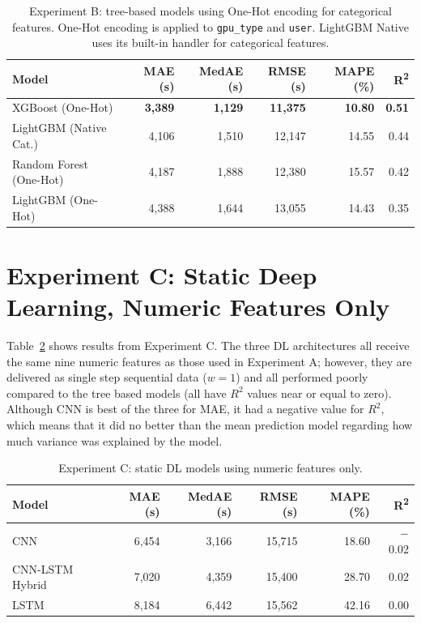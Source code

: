 \begin{table}[H]
\centering
\caption[Results for Experiment B]{Experiment B: tree-based models using One-Hot encoding for categorical features. One-Hot encoding is applied to \texttt{gpu\_type} and \texttt{user}. LightGBM Native uses its built-in handler for categorical features.}
\label{tab:expb-full}
\begin{tabular}{lrrrrr}
\hline
\textbf{Model} & \textbf{MAE (s)} & \textbf{MedAE (s)} & \textbf{RMSE (s)} & \textbf{MAPE (\%)} & \textbf{R\textsuperscript{2}} \\ 
\hline
XGBoost (One-Hot)        & \textbf{3{,}389} & \textbf{1{,}129} & \textbf{11{,}375} & \textbf{10.80} & \textbf{0.51} \\ 
LightGBM (Native Cat.)   & 4{,}106 & 1{,}510 & 12{,}147 & 14.55 & 0.44 \\ 
Random Forest (One-Hot)  & 4{,}187 & 1{,}888 & 12{,}380 & 15.57 & 0.42 \\ 
LightGBM (One-Hot)       & 4{,}388 & 1{,}644 & 13{,}055 & 14.43 & 0.35 \\ 
\hline
\end{tabular}
\end{table}

\clearpage
\section{Experiment C: Static Deep Learning, Numeric Features Only}

Table~\ref{tab:expc-full} shows results from Experiment C. The three DL architectures all receive the same nine numeric features as those used in Experiment A; however, they are delivered as single step sequential data ($w=1$) and all performed poorly compared to the tree based models (all have $R^{2}$ values near or equal to zero). Although CNN is best of the three for MAE, it had a negative value for $R^{2}$, which means that it did no better than the mean prediction model regarding how much variance was explained by the model.

\begin{table}[H]
\centering
\caption[Results for Experiment C]{Experiment C: static DL models using numeric features only.}
\label{tab:expc-full}
\begin{tabular}{lrrrrr}
\hline
\textbf{Model} & \textbf{MAE (s)} & \textbf{MedAE (s)} & \textbf{RMSE (s)} & \textbf{MAPE (\%)} & \textbf{R\textsuperscript{2}} \\ 
\hline
CNN            & 6{,}454 & 3{,}166 & 15{,}715 & 18.60 & $-$0.02 \\ 
CNN-LSTM Hybrid & 7{,}020 & 4{,}359 & 15{,}400 & 28.70 & 0.02 \\ 
LSTM           & 8{,}184 & 6{,}442 & 15{,}562 & 42.16 & 0.00 \\ 
\hline
\end{tabular}
\end{table}


